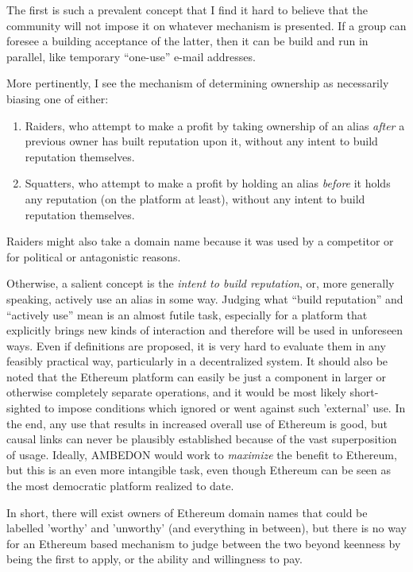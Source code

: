 \documentclass[10pt,a4paper]{article}
\begin{document}
The first is such a prevalent concept that I find it hard to believe that the community will not impose it on whatever mechanism is presented. If a group can foresee a building acceptance of the latter, then it can be build and run in parallel, like temporary ``one-use'' e-mail addresses.

More pertinently, I see the mechanism of determining ownership as necessarily biasing one of either:

\begin{enumerate}
\item Raiders, who attempt to make a profit by taking ownership of an alias {\it after} a previous owner has built reputation upon it, without any intent to build reputation themselves.
\item Squatters, who attempt to make a profit by holding an alias {\it before} it holds any reputation (on the platform at least), without any intent to build reputation themselves. 
\end{enumerate}

Raiders might also take a domain name because it was used by a competitor or for political or antagonistic reasons.
 
Otherwise, a salient concept is the {\it intent to build reputation}, or, more generally speaking, actively use an alias in some way. Judging what ``build reputation'' and ``actively use'' mean is an almost futile task, especially for a platform that explicitly brings new kinds of interaction and therefore will be used in unforeseen ways. Even if definitions are proposed, it is very hard to evaluate them in any feasibly practical way, particularly in a decentralized system. It should also be noted that the Ethereum platform can easily be just a component in larger or otherwise completely separate operations, and it would be most likely short-sighted to impose conditions which ignored or went against such 'external' use. In the end, any use that results in increased overall use of Ethereum is good, but causal links can never be plausibly established because of the vast superposition of usage. Ideally, AMBEDON would work to {\it maximize} the benefit to Ethereum, but this is an even more intangible task, even though Ethereum can be seen as the most democratic platform realized to date.

In short, there will exist owners of Ethereum domain names that could be labelled 'worthy' and 'unworthy' (and everything in between), but there is no way for an Ethereum based mechanism to judge between the two beyond keenness by being the first to apply, or the ability and willingness to pay. 
\end{document}
